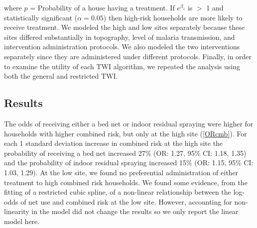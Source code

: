 \documentclass{article}\usepackage[]{graphicx}\usepackage[]{color}
\begin{document}
where $p$  =  Probability of a house having a treatment.  If $e^{\beta_1}$ is $>$ 1 and statistically significant ($\alpha = 0.05$) then high-risk households are more likely to receive treatment.  %
We modeled the high and low sites separately because these sites differed substantially in topography, level of malaria transmission, and intervention administration protocols.  We also modeled the two interventions separately since they are administered under different protocols.  Finally, in order to examine the utility of each TWI algorithm, we repeated the analysis using both the general and restricted TWI.\\  %




























\subsection{Results}
The odds of receiving either a bed net or indoor residual spraying were higher for households with higher combined risk,  but only at the high site (\ref{ORcmb}).  For each 1 standard deviation increase in combined risk at the high site the probability of receiving a bed net increased 27\% (OR: 1.27,  95\% CI: 1.18,  1.35) and the probability of indoor residual spraying increased 15\% (OR: 1.15,  95\% CI: 1.03,  1.29).  At the low site,  we found no preferential administration of either treatment to high combined risk households.  We found some evidence,  from the fitting of a restricted cubic spline,  of a non-linear relationship between the log-odds of net use and combined risk at the low site.  However,  accounting for non-linearity in the model did not change the results so we only report the linear model here.\\ 
\end{document}

